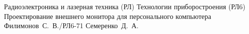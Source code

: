 \documentclass{bmstu}
\begin{document}
\makecourseworktitle
	{Радиоэлектроника и лазерная техника (РЛ)}
	{Технологии приборостроения (РЛ6)}
	{Проектирование внешнего монитора для персонального компьютера}
	{Филимонов~С.~В./РЛ6-71}
	{Семеренко~Д.~А.}
	{}
	{}
	{}

\maketableofcontents

%
%




\end{document}
